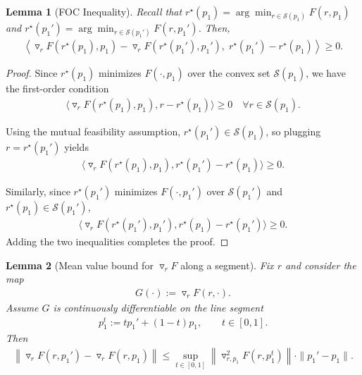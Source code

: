 \documentclass[table]{ai2style/ai2}
\newtheorem{lemma}{Lemma}
\begin{document}
\begin{lemma}[FOC Inequality]\label{lem:mutual_feas_foc}
Recall that $r^\star(p_1)= \arg\min_{r \in\mathcal S(p_1)} F(r, p_1)$ and $r^\star(p_1')= \arg\min_{r \in\mathcal S(p_1')} F(r, p_1')$. 
Then,
\begin{align*}
\left\langle \triangledown_r F(r^\star(p_1),p_1)-\triangledown_r F(r^\star(p_1'),p_1'),\; r^\star(p_1')-r^\star(p_1)\right\rangle \ge 0.
\end{align*}
\end{lemma}

\begin{proof}
Since $r^\star(p_1)$ minimizes $F(\cdot,p_1)$ over the convex set $\mathcal S(p_1)$, we have the first-order condition
\begin{align*}
\langle \triangledown_r F(r^\star(p_1),p_1), r-r^\star(p_1)\rangle \ge 0 \quad \forall r\in\mathcal S(p_1).
\end{align*}

Using the mutual feasibility assumption, $r^\star(p_1')\in\mathcal S(p_1)$, so plugging $r=r^\star(p_1')$ yields
\begin{align*}
\langle \triangledown_r F(r^\star(p_1),p_1), r^\star(p_1')-r^\star(p_1)\rangle \ge 0.
\end{align*}

Similarly, since $r^\star(p_1')$ minimizes $F(\cdot,p_1')$ over $\mathcal S(p_1')$ and $r^\star(p_1)\in\mathcal S(p_1')$,
\begin{align*}
\langle \triangledown_r F(r^\star(p_1'),p_1'), r^\star(p_1)-r^\star(p_1')\rangle \ge 0.
\end{align*}
Adding the two inequalities completes the proof.
\end{proof}

\begin{lemma}[Mean value bound for $\triangledown_r F$ along a segment]\label{lem:mvt_grad_r}
Fix $r$ and consider the map
\begin{align*}
G(\cdot) := \triangledown_r F(r,\cdot).
\end{align*}
Assume $G$ is continuously differentiable on the line segment
\begin{align*}
p_1^t := t p_1' + (1-t)p_1,\qquad t\in[0,1].
\end{align*}
Then
\begin{align*}
\left\|\triangledown_r F(r,p_1')-\triangledown_r F(r,p_1)\right\|
\le
\sup_{t\in[0,1]}\left\|\triangledown^2_{r,p_1}F(r,p_1^t)\right\|\cdot \|p_1'-p_1\|.
\end{align*}
\end{lemma}
\end{document}
